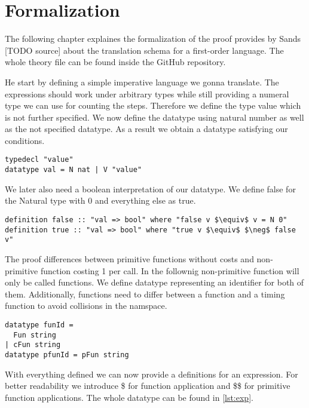 
\chapter{Formalization}\label{chapter:formal}

The following chapter explaines the formalization of the proof provides by Sands [TODO source] about the translation schema for a first-order language.
The whole theory file can be found inside the GitHub repository.

He start by defining a simple imperative language we gonna translate.
The expressions should work under arbitrary types while still providing a numeral type we can use for counting the steps.
Therefore we define the type value which is not further specified.
We now define the datatype using natural number as well as the not specified datatype.
As a result we obtain a datatype satisfying our conditions.
\begin{lstlisting}[language=isabelle]
typedecl "value"
datatype val = N nat | V "value"
\end{lstlisting}

We later also need a boolean interpretation of our datatype.
We define false for the Natural type with 0 and everything else as true.
\begin{lstlisting}[mathescape=true,language=isabelle]
definition false :: "val => bool" where "false v $\equiv$ v = N 0"
definition true :: "val => bool" where "true v $\equiv$ $\neg$ false v"
\end{lstlisting}

The proof differences between primitive functions without costs and non-primitive function costing 1 per call.
In the follownig non-primitive function will only be called functions.
We define datatype representing an identifier for both of them.
Additionally, functions need to differ between a function and a timing function to avoid collisions in the namspace.

\begin{lstlisting}[language=isabelle]
datatype funId =
  Fun string
| cFun string
datatype pfunId = pFun string
\end{lstlisting}

With everything defined we can now provide a definitions for an expression.
For better readability we introduce \$ for function application and \$\$ for primitive function applications. The whole datatype can be found in \ref{lst:exp}.

